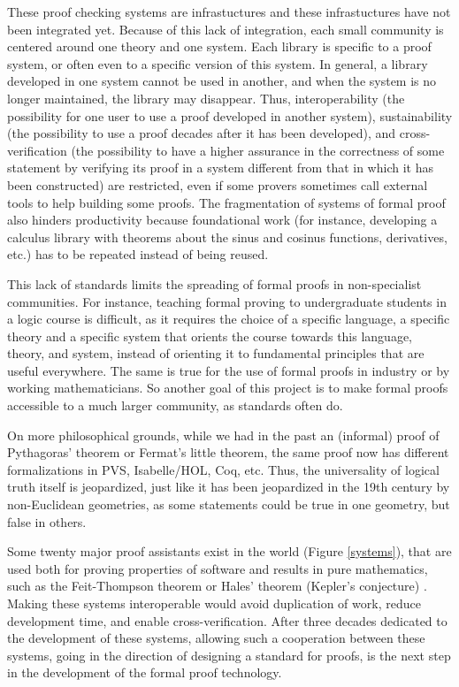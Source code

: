 These proof checking systems are infrastuctures and these
infrastuctures have not been integrated yet.  Because of this lack of
integration, each small community is centered around one theory and
one system. Each library is specific to a proof system, or often even
to a specific version of this system. In general, a library developed
in one system cannot be used in another, and when the system is no
longer maintained, the library may disappear.  Thus, interoperability
(the possibility for one user to use a proof developed in another
system), sustainability (the possibility to use a proof decades after
it has been developed), and cross-verification (the possibility to
have a higher assurance in the correctness of some statement by
verifying its proof in a system different from that in which it has
been constructed) are restricted, even if some provers sometimes call
external tools to help building some proofs. The fragmentation of
systems of formal proof also hinders productivity because foundational
work (for instance, developing a calculus library with theorems about
the sinus and cosinus functions, derivatives, etc.) has to be repeated
instead of being reused.

This lack of standards limits the spreading of formal proofs in
non-specialist communities. For instance, teaching formal proving to
undergraduate students in a logic course is difficult, as it requires
the choice of a specific language, a specific theory and a specific
system that orients the course towards this language, theory, and
system, instead of orienting it to fundamental principles that are
useful everywhere. The same is true for the use of formal proofs in
industry or by working mathematicians. So another goal of this project
is to make formal proofs accessible to a much larger community, as
standards often do.

On more philosophical grounds,
while we had in the past an (informal) proof of Pythagoras' theorem or
Fermat's little theorem, the same proof now has different
formalizations in {\sf PVS}, {\sf Isabelle/HOL}, {\sf Coq}, etc.
Thus, the universality of logical truth itself is jeopardized, just
like it has been jeopardized in the 19th century
by non-Euclidean geometries, as some
statements could be true in one geometry, but false in others.

Some twenty major proof assistants exist in the world (Figure
\ref{systems}), that are used both for proving properties of software
and results in pure mathematics, such as the Feit-Thompson theorem
\cite{Gonthier13} or Hales' theorem (Kepler's conjecture)
\cite{Hales17}.  Making these systems interoperable would avoid
duplication of work, reduce development time, and enable
cross-verification.  After three decades dedicated to the development
of these systems, allowing such a cooperation between these systems,
going in the direction of designing a standard for proofs, is the next
step in the development of the formal proof technology.

